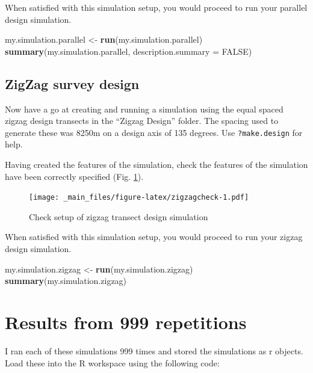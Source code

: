 \documentclass[]{book}
\newenvironment{Shaded}{\begin{snugshade}}{\end{snugshade}}
\newcommand{\KeywordTok}[1]{\textcolor[rgb]{0.13,0.29,0.53}{\textbf{#1}}}
\newcommand{\DataTypeTok}[1]{\textcolor[rgb]{0.13,0.29,0.53}{#1}}
\newcommand{\StringTok}[1]{\textcolor[rgb]{0.31,0.60,0.02}{#1}}
\newcommand{\OtherTok}[1]{\textcolor[rgb]{0.56,0.35,0.01}{#1}}
\newcommand{\NormalTok}[1]{#1}
\theoremstyle{definition}
\theoremstyle{definition}
\theoremstyle{remark}
\begin{document}
When satisfied with this simulation setup, you would proceed to run your
parallel design simulation.

\begin{Shaded}
\begin{Highlighting}[]
\NormalTok{my.simulation.parallel  <-}\StringTok{ }\KeywordTok{run}\NormalTok{(my.simulation.parallel)}
\KeywordTok{summary}\NormalTok{(my.simulation.parallel, }\DataTypeTok{description.summary =} \OtherTok{FALSE}\NormalTok{)}
\end{Highlighting}
\end{Shaded}

\subsection{ZigZag survey design}\label{zigzag-survey-design}

Now have a go at creating and running a simulation using the equal
spaced zigzag design transects in the ``Zigzag Design'' folder. The
spacing used to generate these was 8250m on a design axis of 135
degrees. Use \texttt{?make.design} for help.

Having created the features of the simulation, check the features of the
simulation have been correctly specified (Fig. \ref{fig:zigzagcheck}).

\begin{figure}
\centering
\texttt{[image: \_main\_files/figure-latex/zigzagcheck-1.pdf]}
\caption{\label{fig:zigzagcheck}Check setup of zigzag transect design
simulation}
\end{figure}

When satisfied with this simulation setup, you would proceed to run your
zigzag design simulation.

\begin{Shaded}
\begin{Highlighting}[]
\NormalTok{my.simulation.zigzag  <-}\StringTok{ }\KeywordTok{run}\NormalTok{(my.simulation.zigzag)}
\KeywordTok{summary}\NormalTok{(my.simulation.zigzag)}
\end{Highlighting}
\end{Shaded}

\section{Results from 999
repetitions}\label{results-from-999-repetitions}

I ran each of these simulations 999 times and stored the simulations as
r objects. Load these into the R workspace using the following code:
\end{document}

